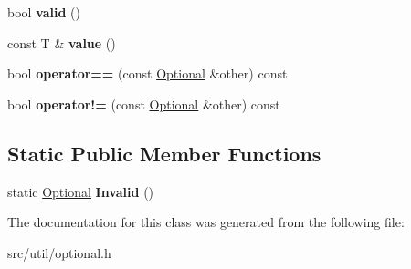 \begin{DoxyCompactItemize}
\item 
bool {\bfseries valid} ()\hypertarget{classlog2hdfs_1_1Optional_a0b781bdf0328c73fb4cf895c05157715}{}\label{classlog2hdfs_1_1Optional_a0b781bdf0328c73fb4cf895c05157715}

\item 
const T \& {\bfseries value} ()\hypertarget{classlog2hdfs_1_1Optional_acc6f00b9ae7d291a81efef9db6cceb2e}{}\label{classlog2hdfs_1_1Optional_acc6f00b9ae7d291a81efef9db6cceb2e}

\item 
bool {\bfseries operator==} (const \hyperlink{classlog2hdfs_1_1Optional}{Optional} \&other) const \hypertarget{classlog2hdfs_1_1Optional_ad3a5a245113358835e966b8eeca56848}{}\label{classlog2hdfs_1_1Optional_ad3a5a245113358835e966b8eeca56848}

\item 
bool {\bfseries operator!=} (const \hyperlink{classlog2hdfs_1_1Optional}{Optional} \&other) const \hypertarget{classlog2hdfs_1_1Optional_a5dc08a0b4b21361471f618fb271fc4cd}{}\label{classlog2hdfs_1_1Optional_a5dc08a0b4b21361471f618fb271fc4cd}

\end{DoxyCompactItemize}
\subsection*{Static Public Member Functions}
\begin{DoxyCompactItemize}
\item 
static \hyperlink{classlog2hdfs_1_1Optional}{Optional} {\bfseries Invalid} ()\hypertarget{classlog2hdfs_1_1Optional_a739b335bb864a5097f06d933aeb21e80}{}\label{classlog2hdfs_1_1Optional_a739b335bb864a5097f06d933aeb21e80}

\end{DoxyCompactItemize}


The documentation for this class was generated from the following file\+:\begin{DoxyCompactItemize}
\item 
src/util/optional.\+h\end{DoxyCompactItemize}
